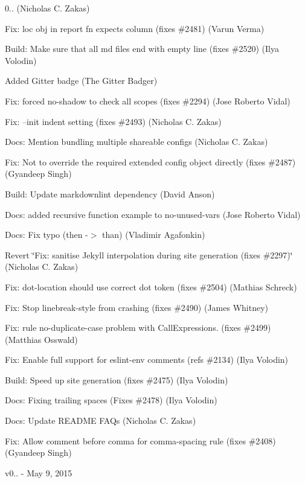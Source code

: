 \begin{DoxyItemize}
\item 0.. (Nicholas C. Zakas)
\item Fix\+: loc obj in report fn expects column (fixes \#2481) (Varun Verma)
\item Build\+: Make sure that all md files end with empty line (fixes \#2520) (Ilya Volodin)
\item Added Gitter badge (The Gitter Badger)
\item Fix\+: forced no-\/shadow to check all scopes (fixes \#2294) (Jose Roberto Vidal)
\item Fix\+: --init indent setting (fixes \#2493) (Nicholas C. Zakas)
\item Docs\+: Mention bundling multiple shareable configs (Nicholas C. Zakas)
\item Fix\+: Not to override the required extended config object directly (fixes \#2487) (Gyandeep Singh)
\item Build\+: Update markdownlint dependency (David Anson)
\item Docs\+: added recursive function example to no-\/unused-\/vars (Jose Roberto Vidal)
\item Docs\+: Fix typo (then -\/$>$ than) (Vladimir Agafonkin)
\item Revert \char`\"{}\+Fix\+: sanitise Jekyll interpolation during site generation (fixes \#2297)\char`\"{} (Nicholas C. Zakas)
\item Fix\+: dot-\/location should use correct dot token (fixes \#2504) (Mathias Schreck)
\item Fix\+: Stop linebreak-\/style from crashing (fixes \#2490) (James Whitney)
\item Fix\+: rule no-\/duplicate-\/case problem with Call\+Expressions. (fixes \#2499) (Matthias Osswald)
\item Fix\+: Enable full support for eslint-\/env comments (refs \#2134) (Ilya Volodin)
\item Build\+: Speed up site generation (fixes \#2475) (Ilya Volodin)
\item Docs\+: Fixing trailing spaces (Fixes \#2478) (Ilya Volodin)
\item Docs\+: Update R\+E\+A\+D\+ME F\+A\+Qs (Nicholas C. Zakas)
\item Fix\+: Allow comment before comma for comma-\/spacing rule (fixes \#2408) (Gyandeep Singh)
\end{DoxyItemize}

v0.. -\/ May 9, 2015


